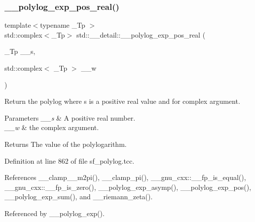 \subsubsection{\texorpdfstring{\+\_\+\+\_\+polylog\+\_\+exp\+\_\+pos\+\_\+real()}{\_\_polylog\_exp\_pos\_real()}\hspace{0.1cm}{\footnotesize\ttfamily [1/2]}}
{\footnotesize\ttfamily template$<$typename \+\_\+\+Tp $>$ \\
std\+::complex$<$\+\_\+\+Tp$>$ std\+::\+\_\+\+\_\+detail\+::\+\_\+\+\_\+polylog\+\_\+exp\+\_\+pos\+\_\+real (\begin{DoxyParamCaption}\item[{\+\_\+\+Tp}]{\+\_\+\+\_\+s,  }\item[{std\+::complex$<$ \+\_\+\+Tp $>$}]{\+\_\+\+\_\+w }\end{DoxyParamCaption})}

Return the polylog where s is a positive real value and for complex argument.


\begin{DoxyParams}{Parameters}
{\em \+\_\+\+\_\+s} & A positive real number. \\
\hline
{\em \+\_\+\+\_\+w} & the complex argument. \\
\hline
\end{DoxyParams}
\begin{DoxyReturn}{Returns}
The value of the polylogarithm. 
\end{DoxyReturn}


Definition at line 862 of file sf\+\_\+polylog.\+tcc.



References \+\_\+\+\_\+clamp\+\_\+\_\+m2pi(), \+\_\+\+\_\+clamp\+\_\+pi(), \+\_\+\+\_\+gnu\+\_\+cxx\+::\+\_\+\+\_\+fp\+\_\+is\+\_\+equal(), \+\_\+\+\_\+gnu\+\_\+cxx\+::\+\_\+\+\_\+fp\+\_\+is\+\_\+zero(), \+\_\+\+\_\+polylog\+\_\+exp\+\_\+asymp(), \+\_\+\+\_\+polylog\+\_\+exp\+\_\+pos(), \+\_\+\+\_\+polylog\+\_\+exp\+\_\+sum(), and \+\_\+\+\_\+riemann\+\_\+zeta().



Referenced by \+\_\+\+\_\+polylog\+\_\+exp().

\mbox{\label{namespacestd_1_1____detail_a8a6390a3855283fc27a5d57dd736b62e}} 
